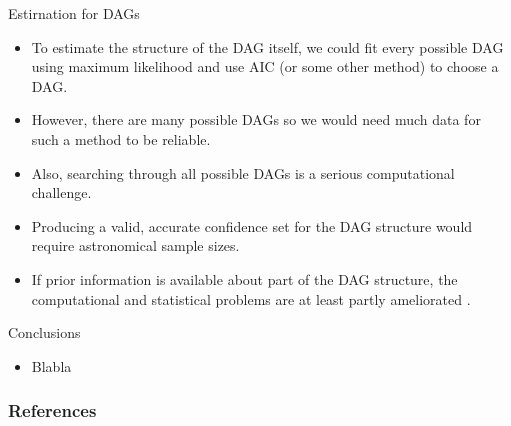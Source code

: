 \documentclass[handout]{beamer}
\begin{document}
\begin{frame}{Estirnation for DAGs}
\scriptsize{
\begin{itemize}

\item To estimate the structure of the DAG itself, we could fit every possible DAG
using maximum likelihood and use AIC (or some other method) to choose a
DAG. 

\item However, there are many possible DAGs so we would need much data
for such a method to be reliable.

\item Also, searching through all possible DAGs is a serious computational challenge. 

\item Producing a valid, accurate confidence set for the DAG structure would require astronomical sample sizes. 

\item If prior information is available about part of the DAG structure, the computational and statistical problems are at least partly ameliorated \cite{wasserman2013all}.

 
\end{itemize}



} 

\end{frame}


\begin{frame}{Conclusions}
\scriptsize{

\begin{itemize}
\item Blabla
\end{itemize}


} 
\end{frame}


\begin{frame}[allowframebreaks]\scriptsize
\frametitle{References}


%
\end{frame}  









\end{document}
